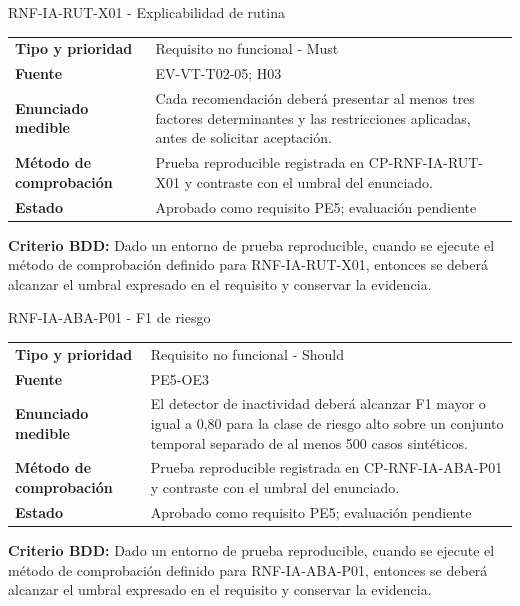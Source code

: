 \begin{reqbox}[colframe=Teal]{RNF-IA-RUT-X01 - Explicabilidad de rutina}
\begin{tabularx}{\textwidth}{>{\bfseries}p{3.2cm}Y}
Tipo y prioridad & Requisito no funcional - Must \\
Fuente & EV-VT-T02-05; H03 \\
Enunciado medible & Cada recomendación deberá presentar al menos tres factores determinantes y las restricciones aplicadas, antes de solicitar aceptación. \\
Método de comprobación & Prueba reproducible registrada en CP-RNF-IA-RUT-X01 y contraste con el umbral del enunciado. \\
Estado & Aprobado como requisito PE5; evaluación pendiente \\
\end{tabularx}
\textbf{Criterio BDD:} Dado un entorno de prueba reproducible, cuando se ejecute el método de comprobación definido para RNF-IA-RUT-X01, entonces se deberá alcanzar el umbral expresado en el requisito y conservar la evidencia.
\end{reqbox}


\begin{reqbox}[colframe=Teal]{RNF-IA-ABA-P01 - F1 de riesgo}
\begin{tabularx}{\textwidth}{>{\bfseries}p{3.2cm}Y}
Tipo y prioridad & Requisito no funcional - Should \\
Fuente & PE5-OE3 \\
Enunciado medible & El detector de inactividad deberá alcanzar F1 mayor o igual a 0,80 para la clase de riesgo alto sobre un conjunto temporal separado de al menos 500 casos sintéticos. \\
Método de comprobación & Prueba reproducible registrada en CP-RNF-IA-ABA-P01 y contraste con el umbral del enunciado. \\
Estado & Aprobado como requisito PE5; evaluación pendiente \\
\end{tabularx}
\textbf{Criterio BDD:} Dado un entorno de prueba reproducible, cuando se ejecute el método de comprobación definido para RNF-IA-ABA-P01, entonces se deberá alcanzar el umbral expresado en el requisito y conservar la evidencia.
\end{reqbox}


